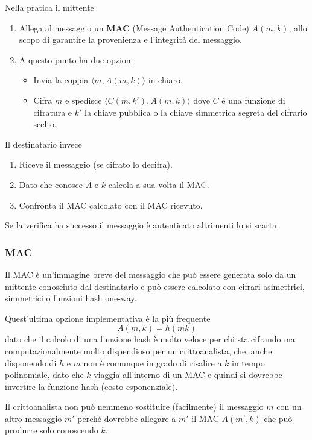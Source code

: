 Nella pratica il mittente
\begin{enumerate}
	\item Allega al messaggio un \textbf{MAC} (Message Authentication Code) $A(m, k)$, allo scopo di garantire la
	      provenienza e l'integrit\`a del messaggio.
	\item A questo punto ha due opzioni
	      \begin{itemize}
		      \item Invia la coppia $\langle m, A(m, k) \rangle$ in chiaro.
		      \item Cifra $m$ e spedisce $\langle C(m, k'), A(m, k) \rangle$ dove $C$ \`e una funzione di cifratura
		            e $k'$ la chiave pubblica o la chiave simmetrica segreta del cifrario scelto.
	      \end{itemize}
\end{enumerate}

Il destinatario invece
\begin{enumerate}
	\item Riceve il messaggio (se cifrato lo decifra).
	\item Dato che conosce $A$ e $k$ calcola a sua volta il MAC.
	\item Confronta il MAC calcolato con il MAC ricevuto.
\end{enumerate}
Se la verifica ha successo il messaggio \`e autenticato altrimenti lo si scarta.

\subsubsection{MAC}
Il MAC \`e un'immagine breve del messaggio che pu\`o essere generata solo da un mittente conosciuto dal destinatario
e pu\`o essere calcolato con cifrari asimettrici, simmetrici o funzioni hash one-way.

Quest'ultima opzione implementativa \`e la pi\`u frequente
\[ A(m, k) = h(m k) \]
dato che il calcolo di una funzione hash \`e molto veloce per chi sta cifrando ma computazionalmente molto dispendioso
per un crittoanalista, che, anche disponendo di $h$ e $m$ non \`e comunque in grado di risalire a $k$ in tempo
polinomiale, dato che $k$ viaggia all'interno di un MAC e quindi si dovrebbe invertire la funzione hash (costo
esponenziale).

Il crittoanalista non pu\`o nemmeno sostituire (facilmente) il messaggio $m$ con un altro messaggio $m'$ perch\'e
dovrebbe allegare a $m'$ il MAC $A(m', k)$ che pu\`o produrre solo conoscendo $k$.

